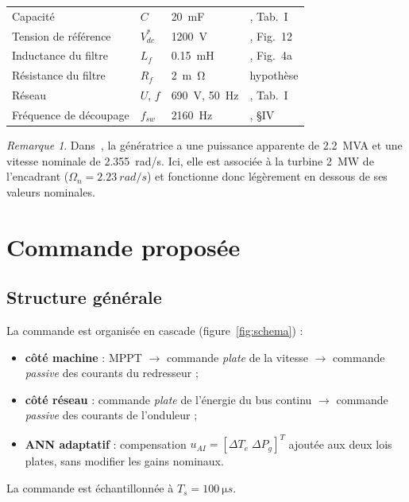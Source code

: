 \documentclass[11pt,a4paper]{article}
\theoremstyle{remark}
\newtheorem{remarque}{Remarque}
\begin{document}
\begin{table}[h]
\begin{tabular}{llll}
Capacité & $C$ & \SI{20}{mF} & \cite{hasan}, Tab.~I\\
Tension de référence & $V_{dc}^*$ & \SI{1200}{V} & \cite{hasan}, Fig.~12\\
Inductance du filtre & $L_f$ & \SI{0,15}{mH} & \cite{hasan}, Fig.~4a\\
Résistance du filtre & $R_f$ & \SI{2}{m\ohm} & hypothèse\\
Réseau & $U$, $f$ & \SI{690}{V}, \SI{50}{Hz} & \cite{hasan}, Tab.~I\\
Fréquence de découpage & $f_{sw}$ & \SI{2160}{Hz} & \cite{hasan}, §IV\\
\bottomrule
\end{tabular}
\end{table}

\begin{remarque}
Dans~\cite{hasan}, la génératrice a une puissance apparente de \SI{2,2}{MVA} et une vitesse
nominale de \SI{2,355}{rad/s}. Ici, elle est associée à la turbine \SI{2}{MW} de l'encadrant
($\Omega_n=\SI{2,23}{rad/s}$) et fonctionne donc légèrement en dessous de ses valeurs nominales.
\end{remarque}

\section{Commande proposée}

\subsection{Structure générale}
La commande est organisée en cascade (figure~\ref{fig:schema}) :
\begin{itemize}
  \item \textbf{côté machine} : MPPT $\rightarrow$ commande \emph{plate} de la vitesse
        $\rightarrow$ commande \emph{passive} des courants du redresseur ;
  \item \textbf{côté réseau} : commande \emph{plate} de l'énergie du bus continu
        $\rightarrow$ commande \emph{passive} des courants de l'onduleur ;
  \item \textbf{ANN adaptatif} : compensation $u_{AI}=[\Delta T_e\;\Delta P_g]^T$ ajoutée aux
        deux lois plates, sans modifier les gains nominaux.
\end{itemize}
La commande est échantillonnée à $T_s=\SI{100}{\micro s}$.
\end{document}
